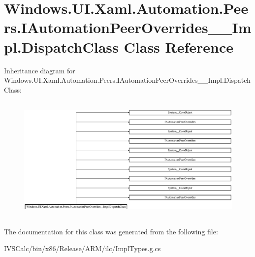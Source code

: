 \hypertarget{class_windows_1_1_u_i_1_1_xaml_1_1_automation_1_1_peers_1_1_i_automation_peer_overrides_____impl_1_1_dispatch_class}{}\section{Windows.\+U\+I.\+Xaml.\+Automation.\+Peers.\+I\+Automation\+Peer\+Overrides\+\_\+\+\_\+\+Impl.\+Dispatch\+Class Class Reference}
\label{class_windows_1_1_u_i_1_1_xaml_1_1_automation_1_1_peers_1_1_i_automation_peer_overrides_____impl_1_1_dispatch_class}
Inheritance diagram for Windows.\+U\+I.\+Xaml.\+Automation.\+Peers.\+I\+Automation\+Peer\+Overrides\+\_\+\+\_\+\+Impl.\+Dispatch\+Class\+:\begin{figure}[H]
\begin{center}
\leavevmode
\includegraphics[height=6.247465cm]{class_windows_1_1_u_i_1_1_xaml_1_1_automation_1_1_peers_1_1_i_automation_peer_overrides_____impl_1_1_dispatch_class}
\end{center}
\end{figure}


The documentation for this class was generated from the following file\+:\begin{DoxyCompactItemize}
\item 
I\+V\+S\+Calc/bin/x86/\+Release/\+A\+R\+M/ilc/Impl\+Types.\+g.\+cs\end{DoxyCompactItemize}

